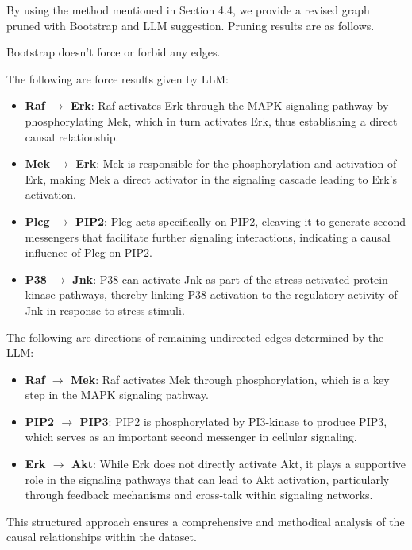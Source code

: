 \documentclass{article}
\begin{document}
\begin{minipage}[t]{0.6\linewidth}
    
By using the method mentioned in Section 4.4, we provide a revised graph pruned with Bootstrap and LLM suggestion.
Pruning results are as follows.
        
Bootstrap doesn't force or forbid any edges.
            
The following are force results given by LLM:
            
\begin{itemize}
            
    \item \textbf{Raf $\rightarrow$ Erk}: Raf activates Erk through the MAPK signaling pathway by phosphorylating Mek, which in turn activates Erk, thus establishing a direct causal relationship.
                
    \item \textbf{Mek $\rightarrow$ Erk}: Mek is responsible for the phosphorylation and activation of Erk, making Mek a direct activator in the signaling cascade leading to Erk's activation.
                
    \item \textbf{Plcg $\rightarrow$ PIP2}: Plcg acts specifically on PIP2, cleaving it to generate second messengers that facilitate further signaling interactions, indicating a causal influence of Plcg on PIP2.
                
    \item \textbf{P38 $\rightarrow$ Jnk}: P38 can activate Jnk as part of the stress-activated protein kinase pathways, thereby linking P38 activation to the regulatory activity of Jnk in response to stress stimuli.
                
\end{itemize}
            
The following are directions of remaining undirected edges determined by the LLM:
\begin{itemize}

    \item \textbf{Raf $\rightarrow$ Mek}: Raf activates Mek through phosphorylation, which is a key step in the MAPK signaling pathway.

    \item \textbf{PIP2 $\rightarrow$ PIP3}: PIP2 is phosphorylated by PI3-kinase to produce PIP3, which serves as an important second messenger in cellular signaling.

    \item \textbf{Erk $\rightarrow$ Akt}: While Erk does not directly activate Akt, it plays a supportive role in the signaling pathways that can lead to Akt activation, particularly through feedback mechanisms and cross-talk within signaling networks.

\end{itemize}
            
This structured approach ensures a comprehensive and methodical analysis of the causal relationships within the dataset.
        
\vfill
\end{minipage}
\end{document}
